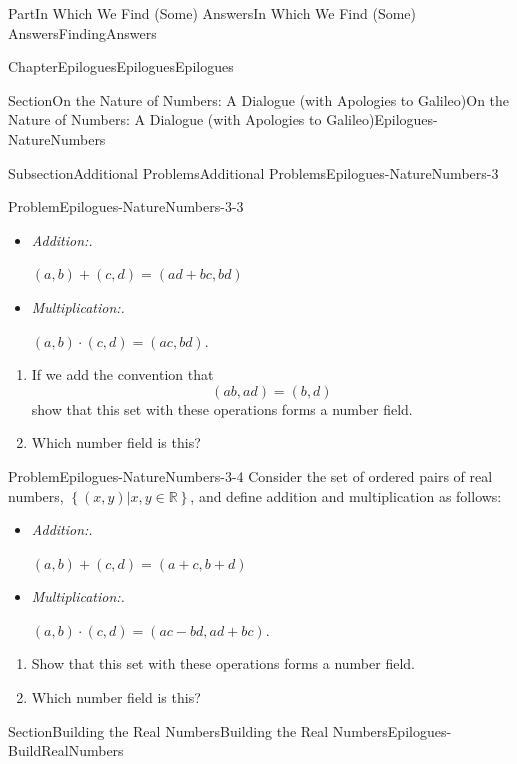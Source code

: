 \documentclass[oneside,10pt,]{book}
\newcommand{\lititle}[1]{{\slshape#1}}
\numberwithin{equation}{part}
\newcommand{\RR}{\mathbb {R}}
\begin{document}
\begin{partptx}{Part}{In Which We Find (Some) Answers}{}{In Which We Find (Some) Answers}{}{}{FindingAnswers}
\begin{chapterptx}{Chapter}{Epilogues}{}{Epilogues}{}{}{Epilogues}
\begin{sectionptx}{Section}{On the Nature of Numbers: A Dialogue (with Apologies to Galileo)}{}{On the Nature of Numbers: A Dialogue (with Apologies to Galileo)}{}{}{Epilogues-NatureNumbers}
\begin{subsectionptx}{Subsection}{Additional Problems}{}{Additional Problems}{}{}{Epilogues-NatureNumbers-3}
\begin{problem}{Problem}{}{Epilogues-NatureNumbers-3-3}
 \par
%
\begin{itemize}[label=\textbullet]
\item{}\lititle{Addition:.}\par%
\(\displaystyle (a,b)+(c,d) = (ad+bc, bd)\)%
\item{}\lititle{Multiplication:.}\par%
\((a,b)\cdot(c,d) = (ac, bd)\).%
\end{itemize}
%
\begin{enumerate}[font=\bfseries,label=(\alph*),ref=\alph*]%
\item{}If we add the convention that%
\begin{equation*}
(ab, ad) = (b,d)
\end{equation*}
show that this set with these operations forms a number field.%
\item{}Which number field is this?%
\end{enumerate}%
\end{problem}
\begin{problem}{Problem}{}{Epilogues-NatureNumbers-3-4}%
Consider the set of ordered pairs of real numbers, \(\left\{(x,y)|x, y\in\RR\right\}\), and define addition and multiplication as follows:%
 \par
%
\begin{itemize}[label=\textbullet]
\item{}\lititle{Addition:.}\par%
\(\displaystyle (a,b)+(c,d) = (a+c, b+d)\)%
\item{}\lititle{Multiplication:.}\par%
\((a,b)\cdot(c,d) = (ac- bd,ad+bc)\).%
\end{itemize}
%
\begin{enumerate}[font=\bfseries,label=(\alph*),ref=\alph*]%
\item{}Show that this set with these operations forms a number field.%
\item{}Which number field is this?%
\end{enumerate}%
\end{problem}
\end{subsectionptx}
\end{sectionptx}
%
%
\typeout{************************************************}
\typeout{************************************************}
%
\begin{sectionptx}{Section}{Building the Real Numbers}{}{Building the Real Numbers}{}{}{Epilogues-BuildRealNumbers}

\end{sectionptx}
\end{chapterptx}
\end{partptx}
\end{document}
